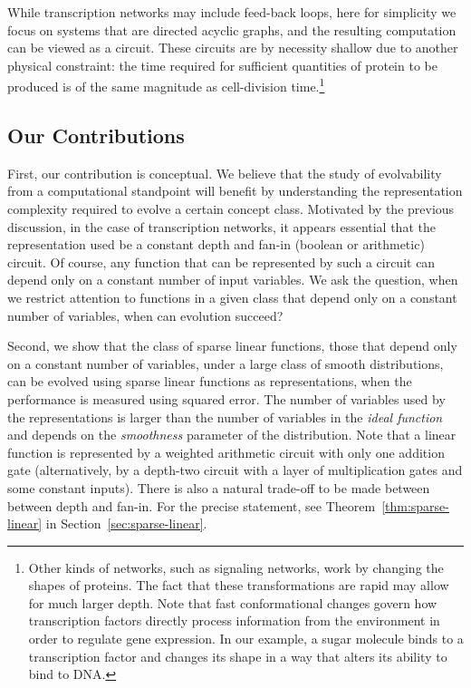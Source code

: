 While transcription networks may include feed-back loops, here for simplicity we
focus on systems that are directed acyclic graphs, and the resulting computation
can be viewed as a circuit. These circuits are by necessity shallow due to
another physical constraint: the time required for sufficient quantities of
protein to be produced is of the same magnitude as cell-division
time.\footnote{Other kinds of networks, such as signaling networks, work by
changing the shapes of proteins. The fact that these transformations are rapid may
allow for much larger depth. Note that fast conformational changes govern how
transcription factors directly process information from the environment in order
to regulate gene expression.  In our example, a sugar molecule binds to a
transcription factor and changes its shape in a way that alters its ability to
bind to DNA.} 

\subsection{Our Contributions}

First, our contribution is conceptual. We believe that the study of evolvability from
a computational standpoint will benefit by understanding the representation
complexity required to evolve a certain concept class. Motivated by the previous
discussion, in the case of transcription networks, it appears essential that the
representation used be a constant depth and fan-in (boolean or arithmetic)
circuit. Of course, any function that can be represented by such a circuit can
depend only on a constant number of input variables. We ask the
question, when we restrict attention to functions in a given class that depend
only on a constant number of variables, when can evolution succeed?

Second, we show that the class of sparse linear functions, those that depend
only on a constant number of variables, under a large class of smooth
distributions, can be evolved using sparse linear functions as representations,
when the performance is measured using squared error. The number of variables
used by the representations is larger than the number of variables in the
\emph{ideal function} and depends on the \emph{smoothness} parameter of the
distribution.  Note that a linear function is represented by a weighted
arithmetic circuit with only one addition gate (alternatively, by a depth-two
circuit with a layer of multiplication gates and some constant inputs). There
is also a natural trade-off to be made between between depth and fan-in. For the
precise statement, see Theorem~\ref{thm:sparse-linear} in
Section~\ref{sec:sparse-linear}.

